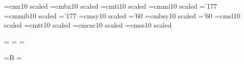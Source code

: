 \font\seventeenrm=cmr10 scaled 
\font\seventeenbf=cmbx10 scaled 
\font\seventeenit=cmti10 scaled 
\font\seventeeni=cmmi10 scaled 	\skewchar\seventeeni='177
\font\seventeenmib=cmmib10 scaled 	\skewchar\seventeenmib='177
\font\seventeensy=cmsy10 scaled 	\skewchar\seventeensy='60
\font\seventeensyb=cmbsy10 scaled 	\skewchar\seventeensyb='60
\font\seventeensl=cmsl10 scaled 
\font\seventeentt=cmtt10 scaled 	\hyphenchar{}
\font\seventeencsc=cmcsc10 scaled 
\font\seventeensf=cmss10 scaled 
%
\fi

\def\hexnumber#1{\ifcase#1 0\or1\or2\or3\or4\or5\or6\or7\or8\or9\or
  A\or B\or C\or D\or E\or F\fi}

\ifprod@font
  \edef\@xm{\hexnumber\xmfam}
  \edef\@ym{\hexnumber\ymfam}
\fi

\def\mib{\hexnumber\mibfam}
\def\syb{\hexnumber\sybfam}

\def\makestrut{%
  \setbox\strutbox=\hbox{%
    \vrule height.7\baselineskip depth.3\baselineskip width \z@}%
}

\def\baselinestretch{1}
\newskip\tmp@bls

\def\b@ls#1{%
  \tmp@bls=#1\relax
  \baselineskip=#1\relax\makestrut
  \normalbaselineskip=\baselinestretch\tmp@bls
  \normalbaselines
}

\def\nostb@ls#1{%
  \normalbaselineskip=#1\relax
  \normalbaselines
  \makestrut
}


%

\newfam\mibfam %
\newfam\sybfam %
\newfam\scfam  %
\newfam\sffam  %

\def\mit{\fam\@ne}
\def\bmit{\fam\mibfam}

\def\cal{\fam\tw@}
\def\bcal{\fam\sybfam}

\def\em{\ifdim\fontdimen1\font>\z@ \rm\else\it\fi}

=\tenex
{}=\tenex
{}=\tenex

=\hbox{\tenex B} \p@renwd= %

